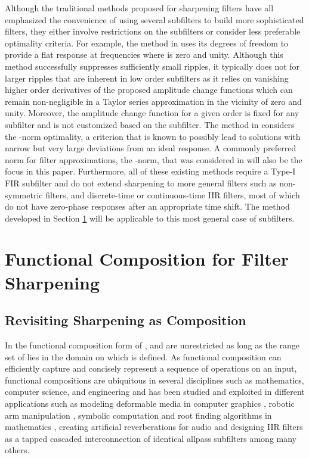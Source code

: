 \documentclass[journal] {IEEEtran}
\begin{document}
Although the traditional methods proposed for sharpening filters have all emphasized the convenience of using several subfilters to build more sophisticated filters, they either involve restrictions on the subfilters or consider less preferable optimality criteria. For example, the method in \cite{Kaiser1977} uses its degrees of freedom to provide a flat response at frequencies where  is zero and unity. Although this method successfully suppresses sufficiently small ripples, it typically does not for larger ripples that are inherent in low order subfilters as it relies on vanishing higher order derivatives of the proposed amplitude change functions which can remain non-negligible in a Taylor series approximation in the vicinity of zero and unity. Moreover, the amplitude change function  for a given order is fixed for any subfilter and is not customized based on the subfilter. The method in \cite{Nakamura} considers the -norm optimality, a criterion that is known to possibly lead to solutions with narrow but very large deviations from an ideal response. A commonly preferred norm for filter approximations, the -norm, that was considered in \cite{Saramaki} will also be the focus in this paper. Furthermore, all of these existing methods require a Type-I FIR subfilter and do not extend sharpening to more general filters such as non-symmetric filters, and discrete-time or continuous-time IIR filters, most of which do not have zero-phase responses after an appropriate time shift. The method developed in Section \ref{sec:composition} will be applicable to this most general case of subfilters.

\section{Functional Composition for Filter Sharpening}\label{sec:composition}
\subsection{Revisiting Sharpening as Composition}
In the functional composition form of ,  and  are unrestricted as long as the range set of  lies in the domain on which  is defined. As functional composition can efficiently capture and concisely represent a sequence of operations on an input, functional compositions are ubiquitous in several disciplines such as mathematics, computer science, and engineering and has been studied and exploited in different applications such as modeling deformable media in computer graphics \cite{Sederberg1986}, robotic arm manipulation \cite{Minimair2000, Gathen1995}, symbolic computation and root finding algorithms in mathematics \cite{Barton, Barton1985, Zippel1985}, creating artificial reverberations for audio \cite{Schroeder} and designing IIR filters as a tapped cascaded interconnection of identical allpass subfilters \cite{Saramaki1987} among many others.
\end{document}
